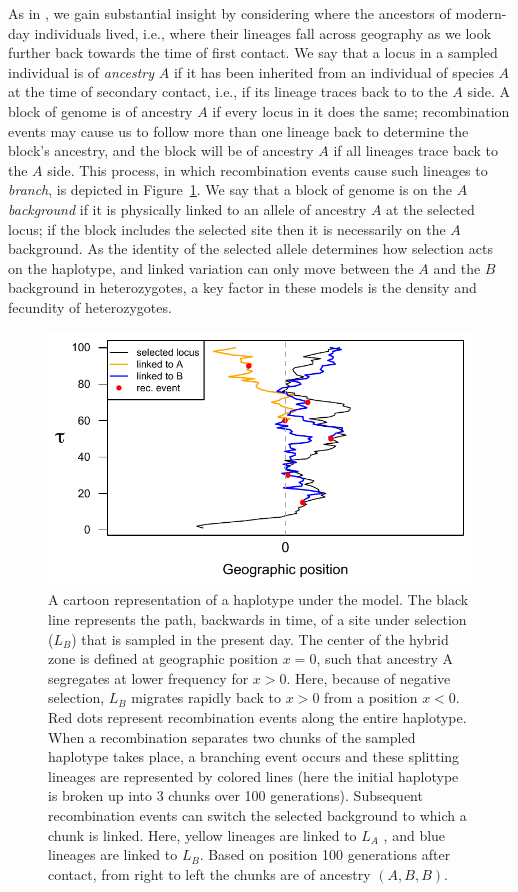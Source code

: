 \documentclass[11pt,letterpaper]{article}
\begin{document}
As in \citet{Sedghifar2015}, 
we gain substantial insight by considering where the ancestors of modern-day individuals lived,
i.e., where their lineages fall across geography as we look further back towards the time of first contact.
We say that a locus in a sampled individual is of \emph{ancestry} $A$ if it has been inherited from an individual of species $A$ at the time of secondary contact,
i.e., if its lineage traces back to to the $A$ side.
A block of genome is of ancestry $A$ if every locus in it does the same;
recombination events may cause us to follow more than one lineage back to determine the block's ancestry,
and the block will be of ancestry $A$ if all lineages trace back to the $A$ side.
This process, in which recombination events cause such lineages to \emph{branch},
is depicted in Figure~\ref{Fig:schematic}.
We say that a block of genome is on the $A$ \emph{background} if it is physically linked to an allele of ancestry $A$ at the selected locus;
if the block includes the selected site then it is necessarily on the $A$ background.
As the identity of the selected allele determines how selection acts on the haplotype,
and linked variation can only move between the $A$ and the $B$ background in heterozygotes,
a key factor in these models is the density and fecundity of heterozygotes.

\begin{figure}
\includegraphics{figs/BM_schematic}
\caption{A cartoon representation of a haplotype under the model. The black line represents the path, backwards in time, of a site under selection ($L_B$) that is sampled in the present day. The center of the hybrid zone is defined at geographic position $x=0$, such that ancestry A segregates at lower frequency for $x>0$. Here, because of negative selection, $L_B$ migrates rapidly back to $x>0$ from a position $x<0$. Red dots represent recombination events along the entire haplotype. When a recombination separates two chunks of the sampled haplotype takes place, a branching event occurs and these splitting lineages are represented by colored lines (here the initial haplotype is broken up into 3 chunks over 100 generations). Subsequent recombination events can switch the selected background to which a chunk is linked.  Here, yellow lineages are linked to $L_A$ , and blue lineages are linked to $L_B$. Based on position 100 generations after contact, from right to left the chunks are of ancestry $(A,B,B)$.}\label{Fig:schematic}
\end{figure}
\end{document}
